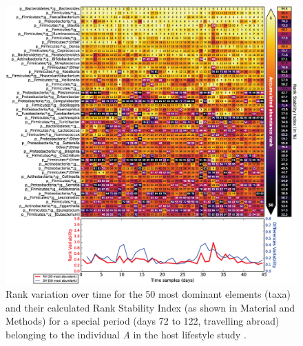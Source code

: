 \begin{figure}
	\centering
	\includegraphics[width=1.0\textwidth]{figs/Fig4.eps}
	\caption{Rank variation over time for the 50 most dominant elements (taxa) and their calculated Rank Stability Index (as shown in Material and Methods) for a special period (days 72 to 122, travelling abroad) belonging to the individual \emph{A} in the host lifestyle study \cite{hostlife}.}
	\label{fig:corrank_HLS_abroad}
\end{figure}

